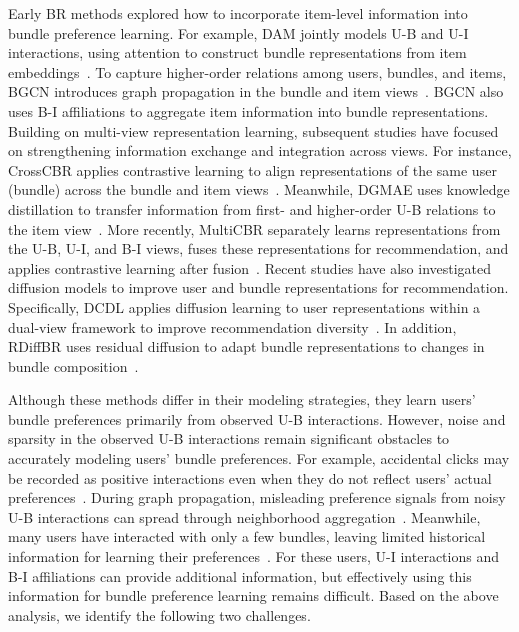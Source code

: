 \documentclass[letterpaper]{article}
\begin{document}
Early BR methods explored how to incorporate item-level information into bundle preference learning. For example, DAM jointly models U-B and U-I interactions, using attention to construct bundle representations from item embeddings~\cite{chen2019dam}. To capture higher-order relations among users, bundles, and items, BGCN introduces graph propagation in the bundle and item views~\cite{chang2020bgcn}. BGCN also uses B-I affiliations to aggregate item information into bundle representations. Building on multi-view representation learning, subsequent studies have focused on strengthening information exchange and integration across views. For instance, CrossCBR applies contrastive learning to align representations of the same user (bundle) across the bundle and item views~\cite{ma2022crosscbr}. Meanwhile, DGMAE uses knowledge distillation to transfer information from first- and higher-order U-B relations to the item view~\cite{ren2023dgmae}. More recently, MultiCBR separately learns representations from the U-B, U-I, and B-I views, fuses these representations for recommendation, and applies contrastive learning after fusion~\cite{ma2024multicbr}. Recent studies have also investigated diffusion models to improve user and bundle representations for recommendation. Specifically, DCDL applies diffusion learning to user representations within a dual-view framework to improve recommendation diversity~\cite{chen2025dcdl}. In addition, RDiffBR uses residual diffusion to adapt bundle representations to changes in bundle composition~\cite{zhang2026rdiffbr}.

Although these methods differ in their modeling strategies, they learn users' bundle preferences primarily from observed U-B interactions. However, noise and sparsity in the observed U-B interactions remain significant obstacles to accurately modeling users' bundle preferences. For example, accidental clicks may be recorded as positive interactions even when they do not reflect users' actual preferences~\cite{jiang2026cafu}. During graph propagation, misleading preference signals from noisy U-B interactions can spread through neighborhood aggregation~\cite{wu2021sgl}. Meanwhile, many users have interacted with only a few bundles, leaving limited historical information for learning their preferences~\cite{chang2020bgcn}. For these users, U-I interactions and B-I affiliations can provide additional information, but effectively using this information for bundle preference learning remains difficult. Based on the above analysis, we identify the following two challenges.
\end{document}
